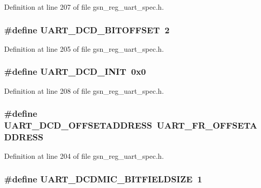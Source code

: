 Definition at line 207 of file gsn\_\-reg\_\-uart\_\-spec.h.

\hypertarget{a00575_a2ec1b6b1b8b3b500d3bc00d5979b7ea3}{
\subsubsection[{UART\_\-DCD\_\-BITOFFSET}]{\setlength{\rightskip}{0pt plus 5cm}\#define UART\_\-DCD\_\-BITOFFSET~2}}
\label{a00575_a2ec1b6b1b8b3b500d3bc00d5979b7ea3}


Definition at line 205 of file gsn\_\-reg\_\-uart\_\-spec.h.

\hypertarget{a00575_a23780bc30c1059bfffd1ce89d61ad0ff}{
\subsubsection[{UART\_\-DCD\_\-INIT}]{\setlength{\rightskip}{0pt plus 5cm}\#define UART\_\-DCD\_\-INIT~0x0}}
\label{a00575_a23780bc30c1059bfffd1ce89d61ad0ff}


Definition at line 208 of file gsn\_\-reg\_\-uart\_\-spec.h.

\hypertarget{a00575_a1e51598e084d41ae1bfd22e01b5c4aa1}{
\subsubsection[{UART\_\-DCD\_\-OFFSETADDRESS}]{\setlength{\rightskip}{0pt plus 5cm}\#define UART\_\-DCD\_\-OFFSETADDRESS~UART\_\-FR\_\-OFFSETADDRESS}}
\label{a00575_a1e51598e084d41ae1bfd22e01b5c4aa1}


Definition at line 204 of file gsn\_\-reg\_\-uart\_\-spec.h.

\hypertarget{a00575_a68dbeaf8c2fc144f62da32271047c10b}{
\subsubsection[{UART\_\-DCDMIC\_\-BITFIELDSIZE}]{\setlength{\rightskip}{0pt plus 5cm}\#define UART\_\-DCDMIC\_\-BITFIELDSIZE~1}}
\label{a00575_a68dbeaf8c2fc144f62da32271047c10b}


